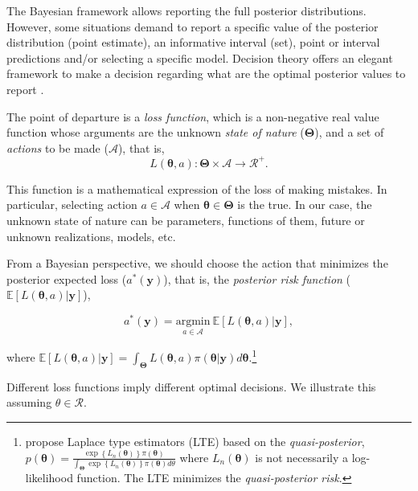 The Bayesian framework allows reporting the full posterior distributions. However, some situations demand to report a specific value of the posterior distribution (point estimate), an informative interval (set), point or interval predictions and/or selecting a specific model. Decision theory offers an elegant framework to make a decision regarding what are the optimal posterior values to report \cite{berger2013statistical}.

The point of departure is a \textit{loss function}, which is a non-negative real value function whose arguments are the unknown \textit{state of nature} ($\mathbf{\Theta}$), and a set of \textit{actions} to be made ($\mathcal{A}$), that is, 
\begin{equation*}
	L(\mathbf{\theta}, a):\mathbf{\Theta}\times \mathcal{A}\rightarrow \mathcal{R}^+.
\end{equation*}

This function is a mathematical expression of the loss of making mistakes. In particular, selecting action $a\in\mathcal{A}$ when $\mathbf{\theta}\in\mathbf{\Theta}$ is the true. In our case, the unknown state of nature can be parameters, functions of them, future or unknown realizations, models, etc.

From a Bayesian perspective, we should choose the action that minimizes the posterior expected loss ($a^*(\mathbf{y})$), that is, the \textit{posterior risk function} ($\mathbb{E}[L(\mathbf{\theta}, a)|\mathbf{y}]$),

\begin{equation*}
	a^*(\mathbf{y})=\underset{a \in \mathcal{A}}{\mathrm{argmin}} \  \mathbb{E}[L(\mathbf{\theta}, a)|\mathbf{y}], 
\end{equation*}

where $\mathbb{E}[L(\mathbf{\theta}, a)|\mathbf{y}]= \int_{\mathbf{\Theta}} L(\mathbf{\theta}, a)\pi(\mathbf{\theta}|\mathbf{y})d\mathbf{\theta}$.\footnote{\cite{Chernozhukov2003} propose Laplace type estimators (LTE) based on the \textit{quasi-posterior}, $p(\mathbf{\theta})=\frac{\exp\left\{L_n(\mathbf{\theta})\right\}\pi(\mathbf{\theta})}{\int_{\mathbf{\Theta}}\exp\left\{L_n(\mathbf{\theta})\right\}\pi(\mathbf{\theta})d\theta}$ where $L_n(\mathbf{\theta})$ is not necessarily a log-likelihood function. The LTE minimizes the \textit{quasi-posterior risk}.}

Different loss functions imply different optimal decisions. We illustrate this assuming $\theta \in \mathcal{R}$.

